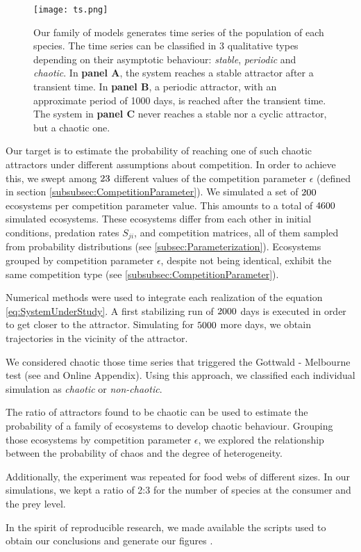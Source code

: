 \begin{figure}
	\begin{center}
		\texttt{[image: ts.png]}
	\end{center}
	\caption{Our family of models generates time series of the population of each species. The time series can be classified in $3$ qualitative types depending on their asymptotic behaviour: \textit{stable}, \textit{periodic} and \textit{chaotic}. In \textbf{panel A}, the system reaches a stable attractor after a transient time. In \textbf{panel B}, a periodic attractor, with an approximate period of 1000 days, is reached after the transient time. The system in \textbf{panel C} never reaches a stable nor a cyclic attractor, but a chaotic one.}
	\label{fig:TimeSeries}
\end{figure}

Our target is to estimate the probability of reaching one of such chaotic attractors under different assumptions about competition. In order to achieve this, we swept among $23$ different values of the competition parameter $\epsilon$ (defined in section \ref{subsubsec:CompetitionParameter}). We simulated a set of $200$ ecosystems per competition parameter value. This amounts to a total of $4600$ simulated ecosystems. These ecosystems differ from each other in initial conditions, predation rates $S_{ji}$, and competition matrices, all of them sampled from probability distributions (see \ref{subsec:Parameterization}). Ecosystems grouped by competition parameter $\epsilon$, despite not being identical, exhibit the same competition type (see \ref{subsubsec:CompetitionParameter}).

Numerical methods were used to integrate each realization of the equation \ref{eq:SystemUnderStudy}. A first stabilizing run of $ 2000 $ days is executed in order to get closer to the attractor. Simulating for $ 5000 $ more days, we obtain trajectories in the vicinity of the attractor.

We considered chaotic those time series that triggered the Gottwald - Melbourne test (see \citet{Gottwald2009} and Online Appendix). Using this approach, we classified each individual simulation as \textit{chaotic} or \textit{non-chaotic}.

The ratio of attractors found to be chaotic can be used to estimate the probability of a family of ecosystems to develop chaotic behaviour. Grouping those ecosystems by competition parameter $\epsilon$, we explored the relationship between the probability of chaos and the degree of heterogeneity.

Additionally, the experiment was repeated for food webs of different sizes. In our simulations, we kept a ratio of 2:3 for the number of species at the consumer and the prey level.

In the spirit of reproducible research, we made available the scripts used to obtain our conclusions and generate our figures \citep{Rodriguez-Sanchez-code-neuchaos}.
